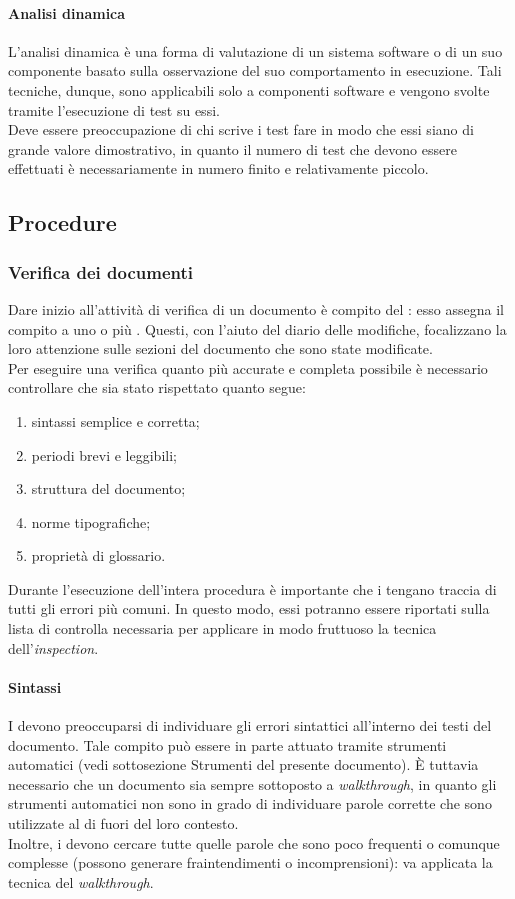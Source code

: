 			\paragraph{Analisi dinamica}
				L'analisi dinamica è una forma di valutazione di un sistema software o di un suo componente basato sulla osservazione del suo comportamento in esecuzione. Tali tecniche, dunque, sono applicabili solo a componenti software e vengono svolte tramite l'esecuzione di test su essi.\\
				Deve essere preoccupazione di chi scrive i test fare in modo che essi siano di grande valore dimostrativo, in quanto il numero di test che devono essere effettuati è necessariamente in numero finito e relativamente piccolo.
	\subsection{Procedure}
		\subsubsection{Verifica dei documenti}
			Dare inizio all'attività di verifica di un documento è compito del : esso assegna il compito a uno o più . 
			Questi, con l'aiuto del diario delle modifiche, focalizzano la loro attenzione sulle sezioni del documento che sono state modificate.\\
			Per eseguire una verifica quanto più accurate e completa possibile è necessario controllare che sia stato rispettato quanto segue:
			\begin{enumerate}
				\item sintassi semplice e corretta;
				\item periodi brevi e leggibili;
				\item struttura del documento;
				\item norme tipografiche;
				\item proprietà di glossario.
			\end{enumerate}
			Durante l'esecuzione dell'intera procedura è importante che i  tengano traccia di tutti gli errori più comuni. In questo modo, 
			essi potranno essere riportati sulla lista di controlla necessaria per applicare in modo fruttuoso la tecnica dell'\textit{inspection}.
			\paragraph{Sintassi}
				I  devono preoccuparsi di individuare gli errori sintattici all'interno dei testi del documento. Tale compito può essere in 
				parte attuato tramite strumenti automatici (vedi sottosezione Strumenti del presente documento). È tuttavia necessario che un documento sia sempre sottoposto a \textit{walkthrough}, in quanto gli strumenti automatici non sono in grado di individuare parole corrette che sono utilizzate al di fuori del loro contesto.\\
				Inoltre, i  devono cercare tutte quelle parole che sono poco frequenti o comunque complesse (possono generare fraintendimenti o incomprensioni): va applicata la tecnica del \textit{walkthrough}.
